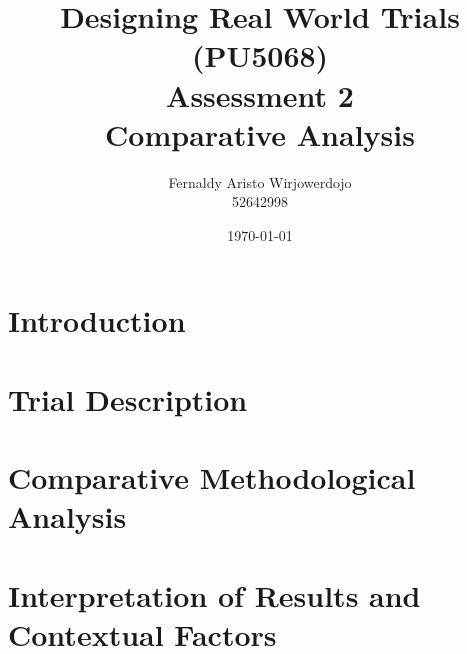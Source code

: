 \documentclass{article}
\title{Designing Real World Trials (PU5068)\\Assessment 2\\Comparative Analysis}
\author{Fernaldy Aristo Wirjowerdojo\\52642998}
\date{\today}
\begin{document}
\maketitle

\section*{Introduction}

\section*{Trial Description}

\section*{Comparative Methodological Analysis}

\section*{Interpretation of Results and Contextual Factors}



\end{document}
